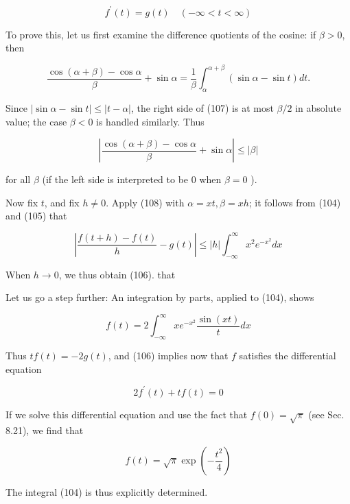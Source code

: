 \documentclass[10pt]{article}
\begin{document}
$$
f^{\prime}(t)=g(t) \quad(-\infty<t<\infty)
$$

To prove this, let us first examine the difference quotients of the cosine: if $\beta>0$, then

$$
\frac{\cos (\alpha+\beta)-\cos \alpha}{\beta}+\sin \alpha=\frac{1}{\beta} \int_{\alpha}^{\alpha+\beta}(\sin \alpha-\sin t) d t .
$$

Since $|\sin \alpha-\sin t| \leq|t-\alpha|$, the right side of (107) is at most $\beta / 2$ in absolute value; the case $\beta<0$ is handled similarly. Thus

$$
\left|\frac{\cos (\alpha+\beta)-\cos \alpha}{\beta}+\sin \alpha\right| \leq|\beta|
$$

for all $\beta$ (if the left side is interpreted to be 0 when $\beta=0$ ).

Now fix $t$, and fix $h \neq 0$. Apply (108) with $\alpha=x t, \beta=x h$; it follows from (104) and (105) that

$$
\left|\frac{f(t+h)-f(t)}{h}-g(t)\right| \leq|h| \int_{-\infty}^{\infty} x^{2} e^{-x^{2}} d x
$$

When $h \rightarrow 0$, we thus obtain (106). that

Let us go a step further: An integration by parts, applied to (104), shows

$$
f(t)=2 \int_{-\infty}^{\infty} x e^{-x^{2}} \frac{\sin (x t)}{t} d x
$$

Thus $t f(t)=-2 g(t)$, and (106) implies now that $f$ satisfies the differential equation

$$
2 f^{\prime}(t)+t f(t)=0
$$

If we solve this differential equation and use the fact that $f(0)=\sqrt{\pi}$ (see Sec. 8.21), we find that

$$
f(t)=\sqrt{\pi} \exp \left(-\frac{t^{2}}{4}\right)
$$

The integral (104) is thus explicitly determined.
\end{document}
